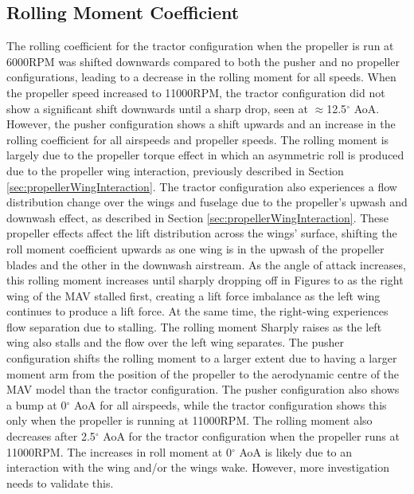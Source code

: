 \subsection{Rolling Moment Coefficient}

The rolling coefficient for the tractor configuration when the propeller is run at 6000RPM was shifted downwards compared to both the pusher and no propeller configurations, leading to a decrease in the rolling moment for all speeds. When the propeller speed increased to 11000RPM, the tractor configuration did not show a significant shift downwards until a sharp drop, seen at $\approx$12.5$^{\circ}$ \acrshort{AoA}. However, the pusher configuration shows a shift upwards and an increase in the rolling coefficient for all airspeeds and propeller speeds. The rolling moment is largely due to the propeller torque effect in which an asymmetric roll is produced due to the propeller wing interaction, previously described in Section \ref{sec:propellerWingInteraction}. The tractor configuration also experiences a flow distribution change over the wings and fuselage due to the propeller's upwash and downwash effect, as described in Section \ref{sec:propellerWingInteraction}. These propeller effects affect the lift distribution across the wings' surface, shifting the roll moment coefficient upwards as one wing is in the upwash of the propeller blades and the other in the downwash airstream. As the angle of attack increases, this rolling moment increases until sharply dropping off in Figures  to  as the right wing of the MAV stalled first, creating a lift force imbalance as the left wing continues to produce a lift force. At the same time, the right-wing experiences flow separation due to stalling. The rolling moment Sharply raises as the left wing also stalls and the flow over the left wing separates. The pusher configuration shifts the rolling moment to a larger extent due to having a larger moment arm from the position of the propeller to the aerodynamic centre of the MAV model than the tractor configuration. The pusher configuration also shows a bump at 0$^{\circ}$ \acrshort{AoA} for all airspeeds, while the tractor configuration shows this only when the propeller is running at 11000RPM. The rolling moment also decreases after 2.5$^{\circ}$ \acrshort{AoA} for the tractor configuration when the propeller runs at 11000RPM.  The increases in roll moment at 0$^{\circ}$ \acrshort{AoA} is likely due to an interaction with the wing and/or the wings wake. However, more investigation needs to validate this.  

